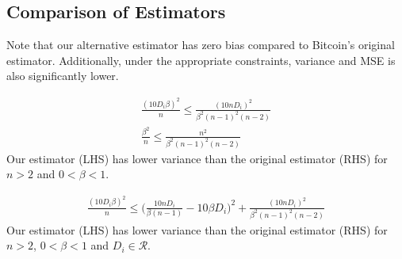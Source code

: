 \subsection{Comparison of Estimators}
Note that our alternative estimator has zero bias compared to Bitcoin's original estimator. Additionally, under the appropriate constraints, variance and MSE is also significantly lower.
\par \noindent {}
\begin{align}
\frac{(10 D_i\beta)^2}{n} \leq \frac{(10n D_i)^2}{\beta^2(n-1)^2(n-2)} \\
\frac{\beta^2}{n} \leq \frac{n^2}{\beta^2(n-1)^2(n-2)} 
\end{align}
Our estimator (LHS) has lower variance than the original estimator (RHS) for $n>2$ and $0<\beta<1$.

\begin{align}
\frac{(10 D_i\beta)^2}{n} \leq \Bigg(\frac{10n D_i}{\beta(n-1)} - 10\beta D_i\Bigg)^2 + \frac{(10n D_i)^2}{\beta^2(n-1)^2(n-2)}
\end{align}
Our estimator (LHS) has lower variance than the original estimator (RHS) for $n>2$, $0<\beta<1$ and $D_i \in \mathcal{R}$. 


